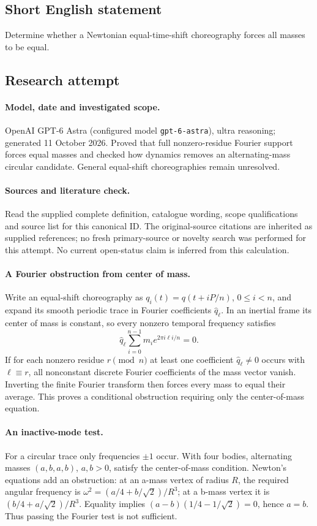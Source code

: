 \documentclass[11pt]{article}
\begin{document}
\subsection{Short English statement}
Determine whether a Newtonian equal-time-shift choreography forces all masses to be equal.
\subsection{Research attempt}
\paragraph{Model, date and investigated scope.}
OpenAI GPT-6 Astra (configured model \texttt{gpt-6-astra}), ultra reasoning; generated 11 October 2026. Proved that full nonzero-residue Fourier support forces equal masses and checked how dynamics removes an alternating-mass circular candidate. General equal-shift choreographies remain unresolved.

\paragraph{Sources and literature check.}
Read the supplied complete definition, catalogue wording, scope qualifications and source list for this canonical ID. The original-source citations are inherited as supplied references; no fresh primary-source or novelty search was performed for this attempt. No current open-status claim is inferred from this calculation.

\paragraph{A Fourier obstruction from center of mass.}Write an equal-shift choreography as \(q_i(t)=q(t+iP/n)\), \(0\le i<n\), and expand its smooth periodic trace in Fourier coefficients \(\widehat q_\ell\). In an inertial frame its center of mass is constant, so every nonzero temporal frequency satisfies
\[\widehat q_\ell\sum_{i=0}^{n-1}m_i e^{2\pi i\ell i/n}=0.
\]
If for each nonzero residue \(r\pmod n\) at least one coefficient \(\widehat q_\ell\ne0\) occurs with \(\ell\equiv r\), all nonconstant discrete Fourier coefficients of the mass vector vanish. Inverting the finite Fourier transform then forces every mass to equal their average. This proves a conditional obstruction requiring only the center-of-mass equation.
\paragraph{An inactive-mode test.}For a circular trace only frequencies \(\pm1\) occur. With four bodies, alternating masses \((a,b,a,b)\), \(a,b>0\), satisfy the center-of-mass condition. Newton's equations add an obstruction: at an a-mass vertex of radius \(R\), the required angular frequency is \(\omega^2=(a/4+b/\sqrt2)/R^3\); at a b-mass vertex it is \((b/4+a/\sqrt2)/R^3\). Equality implies \((a-b)(1/4-1/\sqrt2)=0\), hence \(a=b\). Thus passing the Fourier test is not sufficient.
\end{document}

